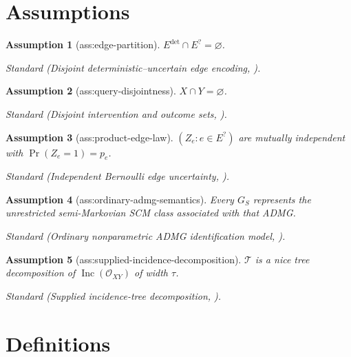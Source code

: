 \documentclass{article}
\newtheorem{assumption}{Assumption}
\begin{document}
\section{Assumptions}

\begin{assumption}[ass:edge-partition]\label{ass:edge-partition}
\(E^{\mathrm{det}}\cap E^{?}=\varnothing\).
\par\smallskip\noindent\emph{Standard} (Disjoint deterministic--uncertain edge encoding, \cite{akbari2023uncertain}).
\end{assumption}

\begin{assumption}[ass:query-disjointness]\label{ass:query-disjointness}
\(X\cap Y=\varnothing\).
\par\smallskip\noindent\emph{Standard} (Disjoint intervention and outcome sets, \cite{shpitserpearl2008hierarchy}).
\end{assumption}

\begin{assumption}[ass:product-edge-law]\label{ass:product-edge-law}
\((Z_e:e\in E^{?})\) are mutually independent with \(\Pr(Z_e=1)=p_e\).
\par\smallskip\noindent\emph{Standard} (Independent Bernoulli edge uncertainty, \cite{akbari2023uncertain}).
\end{assumption}

\begin{assumption}[ass:ordinary-admg-semantics]\label{ass:ordinary-admg-semantics}
Every \(G_S\) represents the unrestricted semi-Markovian SCM class associated with that ADMG.
\par\smallskip\noindent\emph{Standard} (Ordinary nonparametric ADMG identification model, \cite{shpitserpearl2008hierarchy}).
\end{assumption}

\begin{assumption}[ass:supplied-incidence-decomposition]\label{ass:supplied-incidence-decomposition}
\(\mathcal T\) is a nice tree decomposition of \(\operatorname{Inc}(\mathcal O_{XY})\) of width \(\tau\).
\par\smallskip\noindent\emph{Standard} (Supplied incidence-tree decomposition, \cite{samerszeider2010modelcounting}).
\end{assumption}

\section{Definitions}
\end{document}
